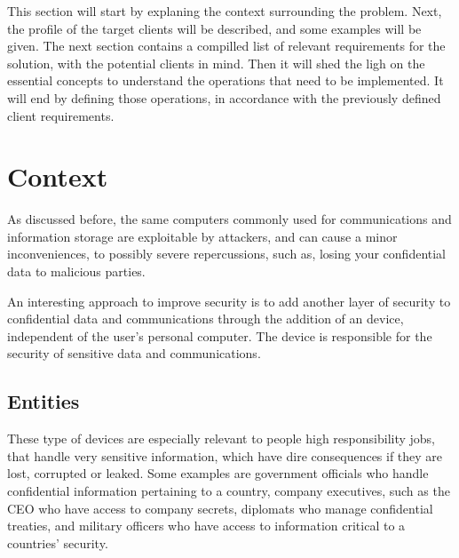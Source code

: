 \cleardoublepage
\label{chap:problem}

This section will start by explaning the context surrounding the problem.
Next, the profile of the target clients will be described, and some examples will be given.
The next section contains a compilled list of relevant requirements for the solution, with the potential clients in mind.
Then it will shed the ligh on the essential concepts to understand the operations that need to be implemented. It will end by defining those operations, in accordance with the previously defined client requirements.

\section{Context} \label{chap:problem:context}

As discussed before, the same computers commonly used for communications and information storage are exploitable by attackers, and can cause a minor inconveniences, to possibly severe repercussions, such as, losing your confidential data to malicious parties.

An interesting approach to improve security is to add another layer of security to confidential data and communications through the addition of an device, independent of the user's personal computer. The device is responsible for the security of sensitive data and communications.

\subsection{Entities} \label{chap:problem:entities}

These type of devices are especially relevant to people high responsibility jobs, that handle very sensitive information, which have dire consequences if they are lost, corrupted or leaked.
Some examples are government officials who handle confidential information pertaining to a country, company executives, such as the CEO who have access to company secrets, diplomats who manage confidential treaties, and military officers who have access to information critical to a countries' security.

